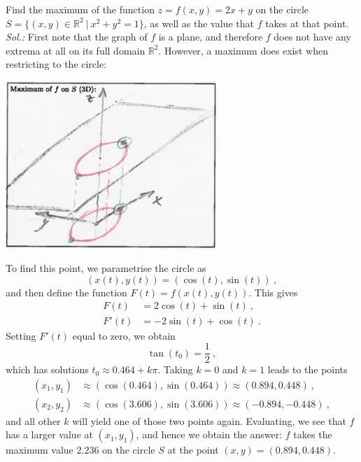 \begin{example}
\label{expl:naive_opt}
Find the maximum of the function $z=f(x,y)=2x+y$ on the circle $S = \{ (x,y) \in \mathbb{R}^2 \: | \: x^2+y^2=1 \}$, as well as the value that $f$ takes at that point.\\
{\it Sol.:} First note that the graph of $f$ is a plane, and therefore $f$ does not have any extrema at all on its full domain $\mathbb{R}^2$. However, a maximum does exist when restricting to the circle:
\begin{center}
	\includegraphics[width=0.6\textwidth]{./Figures/f311.png}
\end{center}
To find this point, we parametrise the circle as
\[ (x(t),y(t)) = (\cos(t),\sin(t)) \:, \]
and then define the function $F(t)=f(x(t),y(t))$. This gives
\begin{equation*}
\begin{split}
F(t) &= 2\cos(t)+\sin(t) \:, \\
F'(t) &= -2\sin(t)+\cos(t) \:.
\end{split}
\end{equation*}
Setting $F'(t)$ equal to zero, we obtain
\[ \tan(t_0) = \frac12 \:, \]
which has solutions $t_0 \approx 0.464 + k\pi$. Taking $k=0$ and $k=1$ leads to the points
\begin{equation*}
\begin{split}
(x_1,y_1)&\approx(\cos(0.464),\sin(0.464))\approx(0.894,0.448) \:, \\
(x_2,y_2)&\approx(\cos(3.606),\sin(3.606))\approx(-0.894,-0.448) \:,
\end{split}
\end{equation*}
and all other $k$ will yield one of those two points again. Evaluating, we see that $f$ has a larger value at $(x_1,y_1)$, and hence we obtain the answer: $f$ takes the maximum value $2.236$ on the circle $S$ at the point $(x,y)=(0.894,0.448)$.
\end{example}

